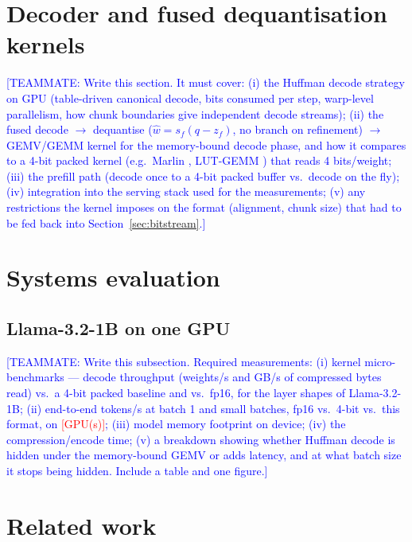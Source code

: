 \documentclass{article}
\newcommand{\tbd}[1]{\textcolor{red}{[#1]}}
\newcommand{\teammate}[1]{\textcolor{blue}{[TEAMMATE: #1]}}
\begin{document}
\section{Decoder and fused dequantisation kernels}
\label{sec:kernels}

\teammate{Write this section. It must cover: (i) the Huffman decode
strategy on GPU (table-driven canonical decode, bits consumed per step,
warp-level parallelism, how chunk boundaries give independent decode
streams); (ii) the fused decode $\to$ dequantise ($\hat w = s_f(q -
z_f)$, no branch on refinement) $\to$ GEMV/GEMM kernel for the
memory-bound decode phase, and how it compares to a 4-bit packed kernel
(e.g.\ Marlin \citep{frantar2025marlin}, LUT-GEMM
\citep{park2024lutgemm}) that reads 4 bits/weight; (iii) the prefill path
(decode once to a 4-bit packed buffer vs.\ decode on the fly); (iv)
integration into the serving stack used for the measurements; (v) any
restrictions the kernel imposes on the format (alignment, chunk size)
that had to be fed back into Section~\ref{sec:bitstream}.}

\section{Systems evaluation}
\label{sec:sysval}

\subsection{Llama-3.2-1B on one GPU}

\teammate{Write this subsection. Required measurements: (i) kernel
micro-benchmarks --- decode throughput (weights/s and GB/s of compressed
bytes read) vs.\ a 4-bit packed baseline and vs.\ fp16, for the layer
shapes of Llama-3.2-1B; (ii) end-to-end tokens/s at batch 1 and small
batches, fp16 vs.\ 4-bit vs.\ this format, on \tbd{GPU(s)}; (iii) model
memory footprint on device; (iv) the compression/encode time; (v) a
breakdown showing whether Huffman decode is hidden under the memory-bound
GEMV or adds latency, and at what batch size it stops being hidden.
Include a table and one figure.}



\section{Related work}
\label{sec:related}
\end{document}
